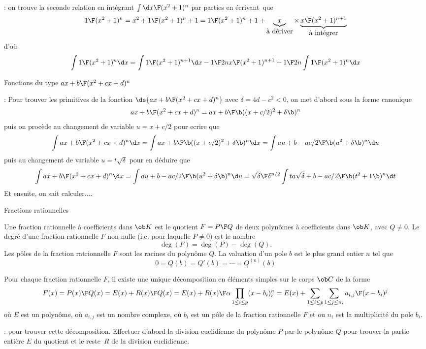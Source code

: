 \Remarque : on trouve la seconde relation en intégrant $\int{\d x\F (x^2+1)^n}$ par parties en écrivant~que 
$$
{1\F (x^2+1)^n}={x^2+1\F (x^2+1)^n+1}={1\F (x^2+1)^n+1}
+\underbrace{x}_{\mbox{à dériver}}\times \underbrace{{x\F(x^2+1)^{n+1}}}_{\mbox{à intégrer}}
$$
d'où 
$$
\int{1\F (x^2+1)^n}\d x =\int{1\F (x^2+1)^{n+1}}\d x -{1\F 2n}{x\F(x^2+1)^{n+1}}+{1\F 2n}\int{1\F (x^2+1)^n}\d x
$$

\Concept [Index=Primitives!des fonctions du type@des fonctions du type ${ax+b\F (x^2+cx+d)^n}$] Fonctions du type ${ax+b\F (x^2+cx+d)^n}$

\Remarque : Pour trouver les primitives de la fonction $\ds{ax+b\F(x^2+cx+d)^n}$ avec $\delta=4d-c^2< 0$, on met d'abord sous la forme canonique 
$$
{ax+b\F(x^2+cx+d)^n}={ax+b\F \b((x+c/2)^2+\delta\b)^n}
$$
puis on procède au changement de variable $u=x+c/2$ pour ecrire que 
$$
\int{ax+b\F(x^2+cx+d)^n}\d x=\int {ax+b\F \b((x+c/2)^2+\delta\b)^n}\d x=\int {au+b-ac/2\F \b(u^2+\delta\b)^n}\d u
$$
puis au changement de variable $u=t\sqrt\delta$ pour en déduire que 
$$
\int{ax+b\F(x^2+cx+d)^n}\d x=\int {au+b-ac/2\F \b(u^2+\delta\b)^n}\d u
={\sqrt\delta\F\delta^{n/2}}\int {ta\sqrt\delta +b-ac/2\F \b(t^2+1\b)^n}\d t
$$
Et ensuite, on sait calculer....
\bigskip


\Concept [Index=Fractionsrationnelles@Fractions rationnelles!definition@définition] Fractions rationnelles

\Definition []  Une fraction rationnelle à coefficients dans $\ob K$ est le quotient $F={P\F Q}$ de deux polynômes à coefficients dans $\ob K$, avec $Q\neq0$.
Le degré d'une fraction rationnelle $F$ non nulle (i.e. pour laquelle $P\neq0$) est le nombre 
$$
\deg(F)=\deg(P)-\deg(Q).
$$
Les pôles de la fraction ratrionnelle $F$ sont les racines du polynôme $Q$. La valuation d'un pole $b$ est le plus grand entier $n$ tel que 
$$
0=Q(b)=Q'(b)=\cdots=Q^{(n)}(b)
$$
\bigskip


\Propriete []  Pour chaque fraction rationnelle $F$, il existe une unique décomposition en éléments simples 
sur le corps $\ob C$ de la forme
$$
F(x)={P(x)\F Q(x)}=E(x)+{R(x)\F Q(x)}=E(x)+{R(x)\F \alpha\prod_{1\le i\le p}(x-b_i)^n_i}
=E(x)+\sum_{1\le i\le p}\sum_{1\le j\le n_i}{a_{i,j}\F (x-b_i)^j}
$$
où $E$ est un polynôme, où $a_{i,j}$ est un nombre complexe, où $b_i$ est un pôle de la fraction
rationnelle $F$ et ou $n_i$ est la multiplicité du pole $b_i$. 
\bigskip

\Remarque : pour trouver cette décomposition. Effectuer d'abord la division euclidienne du polynôme $P$ par le polynôme $Q$ pour trouver la partie entière $E$ du quotient et le reste~$R$ de la division euclidienne. 
\bigskip

